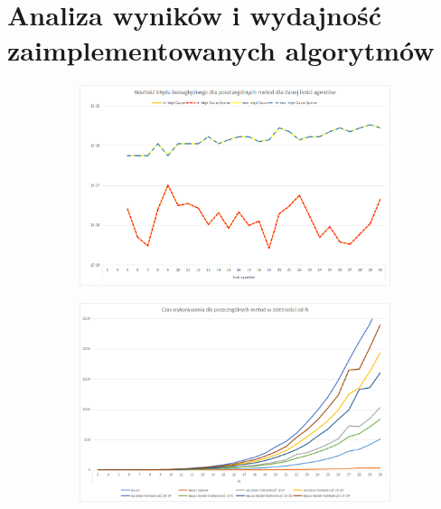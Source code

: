\documentclass[10pt]{article}
\begin{document}
\section{Analiza wyników i wydajność zaimplementowanych algorytmów}
\begin{figure}[h]
	\caption{Wykresy reprezentujące czas wykonania i błędy bezwzględne zaimplementowanych algorytmów \label{rys}}
	\begin{subfigure}{0.5\textwidth}
		\includegraphics[width=\textwidth]{2.png}
		\caption{ \label{Rys2a}}
	\end{subfigure}
	\begin{subfigure}{0.5\textwidth}
	\includegraphics[width=\textwidth]{3.png}
	\caption{ \label{Rys2b}}
	\end{subfigure}
	\begin{subfigure}{0.5\textwidth}

\end{subfigure}
\end{figure}
\end{document}
